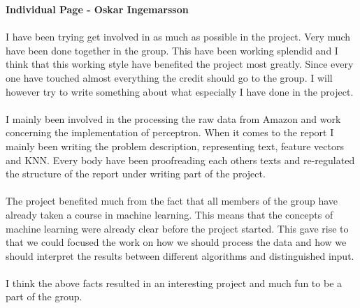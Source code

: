 \newpage
\textbf{Individual Page - Oskar Ingemarsson} \\\\
I have been trying get involved in as much as possible in the project.
Very much have been done together in the group. This have been working
splendid and I think that this working style have benefited the project most
greatly. Since every one have touched almost everything the credit should go to
the group. I will however try to write something about what especially I have
done in the project.
\\\\
I mainly been involved in the processing the raw data from Amazon and work
concerning the implementation of perceptron. When it comes to the report I
mainly been writing the problem description, representing text, feature vectors
and KNN. Every body have been proofreading each others texts and re-regulated the
structure of the report under writing part of the project.
\\\\
The project benefited much from the fact that all members of the group have
already taken a course in machine learning. This means that the concepts of
machine learning were already clear before the project started. This
gave rise to that we could focused the work on how we should process the data
and how we should interpret the results between different algorithms and
distinguished input.
\\\\
I think the above facts resulted in an interesting project and much fun to be a
part of the group.



